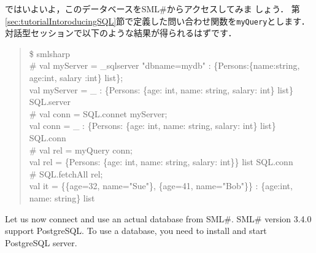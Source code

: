 \documentclass{jbook}
\newcommand{\smlsharp}{SML\#}
\newcommand{\version}{3.4.0}
\newenvironment{program}{\begin{quote}\begin{tt}}%
                        {\end{tt}\end{quote}}
\begin{document}
	ではいよいよ，このデータベースを\smlsharp{}からアクセスしてみま
しょう．
	第\ref{sec:tutorialIntoroducingSQL}節で定義した問い合わせ関数を{\tt myQuery}とします．
	対話型セッションで以下のような結果が得られるはずです．
\begin{program}
\$ smlsharp\\
\# val myServer = \_sqlserver "dbname=mydb" : \{Persons:\{name:string, age:int, salary :int\} list\};\\
val myServer = \_ : \{Persons: \{age: int, name: string, salary: int\} list\} SQL.server\\
\# val conn = SQL.connet myServer;\\
val conn = \_ : \{Persons: \{age: int, name: string, salary: int\} list\} SQL.conn\\
\# val rel = myQuery conn;\\
val rel = \{Persons: \{age: int, name: string, salary: int\}\} list SQL.conn\\
\# SQL.fetchAll rel;\\
val it = \{\{age=32, name="Sue"\}, \{age=41, name="Bob"\}\} : \{age:int, name: string\} list
\end{program}
\else%
	Let us now connect and use an actual database from \smlsharp{}.
	\smlsharp{} version \version{} support PostgreSQL.
	To use a database, you need to install and start PostgreSQL server.
	
\end{document}
